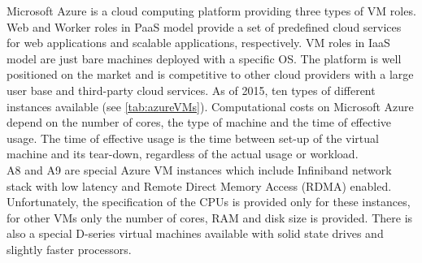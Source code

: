 \documentclass[3p,times]{elsarticle}
\begin{document}
Microsoft Azure is a cloud computing platform providing three types of VM roles. Web and Worker roles in PaaS model provide a set of predefined cloud services for web applications and scalable applications, respectively. VM roles in IaaS model are just bare machines deployed with a specific OS. The platform is well positioned on the market and is competitive to other cloud providers \cite{cloudScores} \cite{twister4azure} with a large user base and third-party cloud services. As of 2015, ten types of different instances available (see \ref{tab:azureVMs}). Computational costs on Microsoft Azure depend on the number of cores, the type of machine and the time of effective usage. The time of effective usage is the time between set-up of the virtual machine and its tear-down, regardless of the actual usage or workload. \\
A8 and A9 are special Azure VM instances which include Infiniband network stack with low latency and Remote Direct Memory Access (RDMA) enabled. Unfortunately, the specification of the CPUs is provided only for these instances, for other VMs only the number of cores, RAM and disk size is provided. There is also a special D-series virtual machines available with solid state drives and slightly faster processors.
 
\end{document}
